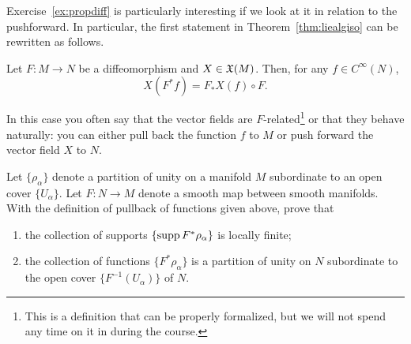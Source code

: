 Exercise~\ref{ex:propdiff} is particularly interesting if we look at it in relation to the pushforward.
In particular, the first statement in Theorem~\ref{thm:liealgiso} can be rewritten as follows.
\begin{proposition}
  Let $F:M\to N$ be a diffeomorphism and $X\in\mathfrak{X}(M)$.
  Then, for any $f\in C^\infty(N)$,
  \begin{equation}
    X(F^* f) = F_*X(f) \circ F.
  \end{equation}
\end{proposition}
In this case you often say that the vector fields are $F$-related\footnote{This is a definition that can be properly formalized, but we will not spend any time on it in during the course.} or that they behave naturally: you can either pull back the function $f$ to $M$ or push forward the vector field $X$ to $N$.

\begin{exercise}
  Let $\{\rho_\alpha\}$ denote a partition of unity on a manifold $M$ subordinate to an open cover $\{U_\alpha\}$.
  Let $F:N\to M$ denote a smooth map between smooth manifolds.
  With the definition of pullback of functions given above, prove that
  \begin{enumerate}
    \item the collection of supports $\{\operatorname{supp} F^*\rho_\alpha\}$ is locally finite;
    \item the collection of functions $\{F^*\rho_\alpha\}$ is a partition of unity on $N$ subordinate to the open cover $\{F^{-1}(U_\alpha)\}$ of $N$.
  \end{enumerate}
\end{exercise}

